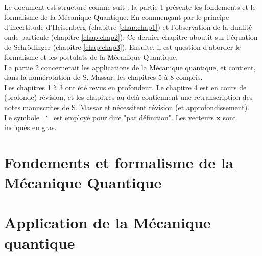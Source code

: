 \documentclass{book}
\numberwithin{equation}{part}
\begin{document}
Le document est structuré comme suit : la partie 1 présente les fondements et le formalisme de la Mécanique Quantique. En commençant par le principe d'incertitude d'Heisenberg (chapitre \ref{chap:chap1}) et l'observation de la dualité onde-particule (chapitre \ref{chap:chap2}). Ce dernier chapitre aboutit sur l'équation de Schrödinger (chapitre \ref{chap:chap3}). Ensuite, il est question d'aborder le formalisme et les postulats de la Mécanique Quantique. \\

La partie 2 concernerait les applications de la Mécanique quantique, et contient, dans la numérotation de S. Massar, les chapitres 5 à 8 compris. \\

Les chapitres 1 à 3 ont été revus en profondeur. Le chapitre 4 est en cours de (profonde) révision, et les chapitres au-delà contiennent une retranscription des notes manuscrites de S. Massar et nécessitent révision (et approfondissement). \\

Le symbole $\doteq$ est employé pour dire "par définition". Les vecteurs $\bm{x}$ sont indiqués en gras.


\newpage
\tableofcontents

\part{Fondements et formalisme de la Mécanique Quantique}
\newpage
\newpage
\newpage
\newpage
\part{Application de la Mécanique quantique}

\newpage
\newpage

\newpage
\end{document}
